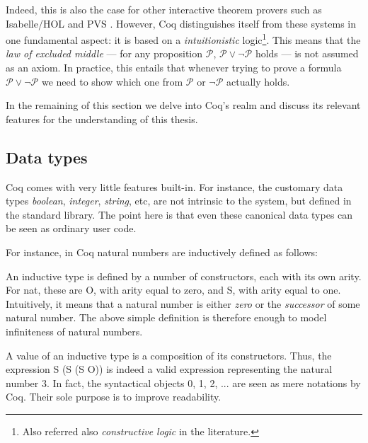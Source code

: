 	
		
	Indeed, this is also the case for other interactive theorem provers such as 
	Isabelle/HOL \cite{Nipkow-Paulson-Wenzel:2002} and PVS \cite{cade92-pvs}. However, Coq distinguishes 
	itself from these systems in one fundamental aspect: it is based on a \textit{intuitionistic}
	logic\footnote{Also referred also \textit{constructive logic} in the literature.}. This means that 
	the \textit{law of excluded middle} --- for any proposition $\mathcal{P}$, $\mathcal{P}  \lor \neg \mathcal{P}$ 
	holds --- is not assumed as an axiom. In practice, this entails that whenever trying to prove 
	a formula $\mathcal{P}  \lor \neg \mathcal{P}$  we need to show which one from $\mathcal{P}$ or $\neg \mathcal{P}$
	actually holds.

		
	In the remaining of this section we delve into Coq's realm and discuss 
	its relevant features for the understanding of this thesis.
	
	

\subsection{Data types}
\label{sub:dtcoq}	
		
	Coq comes with very little features built-in. For instance, the customary
	data types \textit{boolean}, \textit{integer}, \textit{string}, etc, are
	not intrinsic to the system, but defined in the standard library. The point
	here is that even these canonical data types can be seen as 
	ordinary user code.
			
	 For instance, in Coq natural numbers are inductively defined as follows:
	
		
	
	\noindent An inductive type is defined by a number of constructors, each with
	its own arity. For \textsf{nat}, these are \textsf{O}, with arity equal to zero,
	and \textsf{S}, with arity equal to one. Intuitively, it means that a 
	natural number is either \textit{zero} or the \textit{successor}
	of some natural number. The above simple definition	 is therefore 
	enough to model infiniteness of natural numbers. 
	
	A value of an inductive type is a composition of its constructors. Thus,
	the expression \textsf{S (S (S O))} is indeed a valid expression representing
	the natural number 3. In fact, the syntactical
	objects \textsf{0}, \textsf{1}, \textsf{2}, ... are seen as mere notations by Coq.
	Their sole purpose is to improve readability.
			
